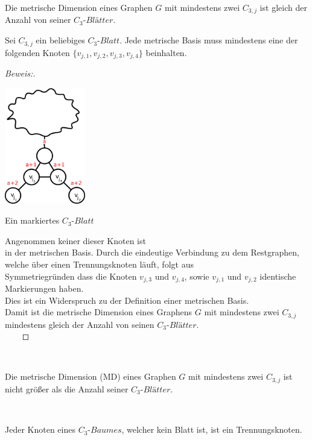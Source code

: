 Die metrische Dimension eines Graphen $G$ mit mindestens zwei $C_{3,j}$ ist gleich der Anzahl von seiner $C_{3}$-$Blätter$.
\begin{lem}
Sei $C_{3,j}$ ein beliebiges $C_{3}$-$Blatt$. Jede metrische Basis muss mindestens eine der folgenden Knoten $\{v_{j,1},v_{j,2},v_{j,3},v_{j,4}\}$ beinhalten.
\end{lem}
\begin{proof}[Beweis:]
\textcolor{white}{lala}
\begin{floatingfigure}[l]{200pt}
\centering
\includegraphics*[width = 100pt]{bilder/beweis.pdf}
\caption{Ein markiertes $C_{3}$-$Blatt$}
\end{floatingfigure}
Angenommen keiner dieser Knoten ist\\in der metrischen Basis. Durch die eindeutige Verbindung zu dem Restgraphen, welche über einen Trennungsknoten läuft, folgt aus\\Symmetriegründen dass die Knoten $v_{j,3}$ und $v_{j,4}$, sowie $v_{j,1}$ und $v_{j,2}$ identische Markierungen haben.\\Dies ist ein Widerspruch zu der Definition einer metrischen Basis.\\
Damit ist die metrische Dimension eines Graphens $G$ mit mindestens zwei $C_{3,j}$\\mindestens gleich der Anzahl von seinen $C_{3}$-$Blätter$.\textcolor{white}{lala}\\\textcolor{white}{lala}
\end{proof}
\textcolor{white}{lala} \vspace{-6mm}
\begin{lem}
Die metrische Dimension (MD) eines Graphen $G$ mit mindestens zwei $C_{3,j}$ ist nicht größer als die Anzahl seiner $C_{3}$-$Blätter$. 
\end{lem}
\textcolor{white}{lala} \vspace{-6mm}
\begin{lem}
\label{bkb}
Jeder Knoten eines $C_{3}$-$Baumes$, welcher kein Blatt ist, ist ein Trennungsknoten.
\end{lem}


